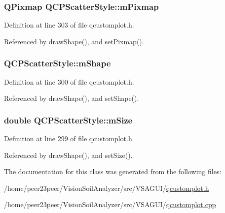 \subsubsection[{m\+Pixmap}]{\setlength{\rightskip}{0pt plus 5cm}Q\+Pixmap Q\+C\+P\+Scatter\+Style\+::m\+Pixmap\hspace{0.3cm}{\ttfamily [protected]}}\label{class_q_c_p_scatter_style_a7697346c89b19d4cd1d8dd33319ec9e3}


Definition at line 303 of file qcustomplot.\+h.



Referenced by draw\+Shape(), and set\+Pixmap().

\hypertarget{class_q_c_p_scatter_style_af1b327f35f107ed108290187bbc8c7c6}{}
\subsubsection[{m\+Shape}]{ Q\+C\+P\+Scatter\+Style\+::m\+Shape\hspace{0.3cm}{\ttfamily [protected]}}\label{class_q_c_p_scatter_style_af1b327f35f107ed108290187bbc8c7c6}


Definition at line 300 of file qcustomplot.\+h.



Referenced by draw\+Shape(), and set\+Shape().

\hypertarget{class_q_c_p_scatter_style_a757da98671eb06b221979373ac2cec91}{}
\subsubsection[{m\+Size}]{\setlength{\rightskip}{0pt plus 5cm}double Q\+C\+P\+Scatter\+Style\+::m\+Size\hspace{0.3cm}{\ttfamily [protected]}}\label{class_q_c_p_scatter_style_a757da98671eb06b221979373ac2cec91}


Definition at line 299 of file qcustomplot.\+h.



Referenced by draw\+Shape(), and set\+Size().



The documentation for this class was generated from the following files\+:\begin{DoxyCompactItemize}
\item 
/home/peer23peer/\+Vision\+Soil\+Analyzer/src/\+V\+S\+A\+G\+U\+I/\hyperlink{qcustomplot_8h}{qcustomplot.\+h}\item 
/home/peer23peer/\+Vision\+Soil\+Analyzer/src/\+V\+S\+A\+G\+U\+I/\hyperlink{qcustomplot_8cpp}{qcustomplot.\+cpp}\end{DoxyCompactItemize}
